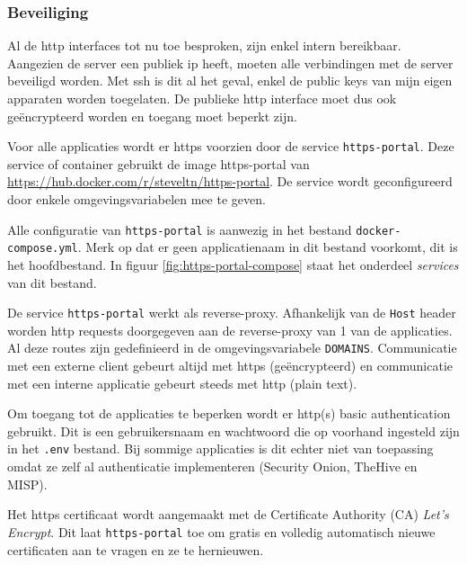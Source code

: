 \documentclass[a4paper, 12pt]{report}
\begin{document}
\subsubsection{Beveiliging}
Al de http interfaces tot nu toe besproken, zijn enkel intern bereikbaar.
Aangezien de server een publiek ip heeft, moeten alle verbindingen met de server beveiligd worden.
Met ssh is dit al het geval, enkel de public keys van mijn eigen apparaten worden toegelaten.
De publieke http interface moet dus ook geëncrypteerd worden en toegang moet beperkt zijn.

Voor alle applicaties wordt er https voorzien door de service \lstinline|https-portal|.
Deze service of container gebruikt de image https-portal van \url{https://hub.docker.com/r/steveltn/https-portal}.
De service wordt geconfigureerd door enkele omgevingsvariabelen mee te geven.

Alle configuratie van \lstinline|https-portal| is aanwezig in het bestand \lstinline|docker-compose.yml|.
Merk op dat er geen applicatienaam in dit bestand voorkomt, dit is het hoofdbestand.
In figuur \ref{fig:https-portal-compose} staat het onderdeel \emph{services} van dit bestand.

De service \lstinline|https-portal| werkt als reverse-proxy.
Afhankelijk van de \lstinline|Host| header worden http requests doorgegeven aan de reverse-proxy van 1 van de applicaties.
Al deze routes zijn gedefinieerd in de omgevingsvariabele \lstinline|DOMAINS|.
Communicatie met een externe client gebeurt altijd met https (geëncrypteerd) en communicatie met een interne applicatie gebeurt steeds met http (plain text).

Om toegang tot de applicaties te beperken wordt er http(s) basic authentication gebruikt.
Dit is een gebruikersnaam en wachtwoord die op voorhand ingesteld zijn in het \lstinline|.env| bestand.
Bij sommige applicaties is dit echter niet van toepassing omdat ze zelf al authenticatie implementeren (Security Onion, TheHive en MISP).

Het https certificaat wordt aangemaakt met de Certificate Authority (CA) \emph{Let's Encrypt}.
Dit laat \lstinline|https-portal| toe om gratis en volledig automatisch nieuwe certificaten aan te vragen en ze te hernieuwen.
\end{document}
